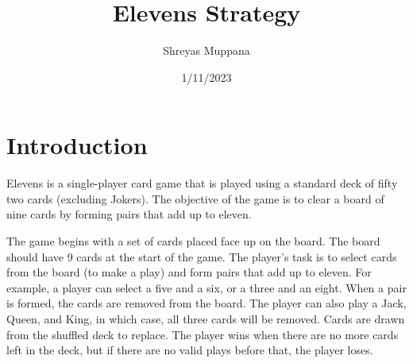 \documentclass{article}
\title{Elevens Strategy}
\author{Shreyas Muppana}
\date{1/11/2023}
\begin{document}
\maketitle

\section{Introduction}

Elevens is a single-player card game that is played using a standard deck of fifty two cards (excluding Jokers). The objective of the game is to clear a board of nine cards by forming pairs that add up to eleven.

The game begins with a set of cards placed face up on the board. The board should have 9 cards at the start of the game. The player's task is to select cards from the board (to make a play) and form pairs that add up to eleven. For example, a player can select a five and a six, or a three and an eight. When a pair is formed, the cards are removed from the board. The player can also play a Jack, Queen, and King, in which case, all three cards will be removed. Cards are drawn from the shuffled deck to replace. The player wins when there are no more cards left in the deck, but if there are no valid plays before that, the player loses.
\end{document}
